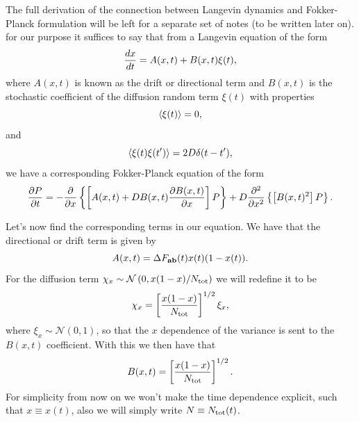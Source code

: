 The full derivation of the connection between Langevin dynamics and Fokker-
Planck formulation will be left for a separate set of notes \manuelComment(to
be written later on). for our purpose it suffices to say that from a Langevin
equation of the form
\begin{equation}
  {d{x} \over dt} = A(x, t) + B(x, t) \xi(t),
\end{equation}
where $A(x, t)$ is known as the drift or directional term and $B(x, t)$ is the
stochastic coefficient of the diffusion random term $\xi(t)$ with properties
\begin{equation}
  \left\langle \xi(t) \right\rangle = 0,
\end{equation}
and
\begin{equation}
  \left\langle \xi(t) \xi(t') \right\rangle = 2D \delta(t - t'),
\end{equation}
we have a corresponding Fokker-Planck equation of the form
\begin{equation}
  {\partial P \over \partial t} = - {\partial \over \partial x}
  \left\{ \left[ A(x, t) + D B(x, t) {\partial B(x, t) \over \partial x}
  \right] P \right\} +
  D {\partial^2 \over \partial x^2} \left\{ \left[ B(x, t)^2 \right] P \right\}.
\end{equation}

Let's now find the corresponding terms in our equation. We have that the
directional or drift term is given by
\begin{equation}
  A(x, t) = \Delta F_{\mathbf{ab}}(t) x(t) (1 - x(t)).
\end{equation}
For the diffusion term $\chi_x \sim \mathcal{N} \left( 0, x(1-x)/N_{\text{tot}} \right)$
we will redefine it to be
\begin{equation}
  \chi_x = \left[ {x (1 - x) \over N_{\text{tot}}} \right]^{1/2} \xi_x,
\end{equation}
where $\xi_x \sim \mathcal{N}(0, 1)$, so that the $x$ dependence of the variance
is sent to the $B(x, t)$ coefficient. With this we then have that
\begin{equation}
  B(x, t) = \left[ {x (1 - x) \over N_{\text{tot}}} \right]^{1/2}.
\end{equation}
For simplicity from now on we won't make the time dependence explicit, such that
$x \equiv x(t)$, also we will simply write $N \equiv N_{\text{tot}}(t)$.

